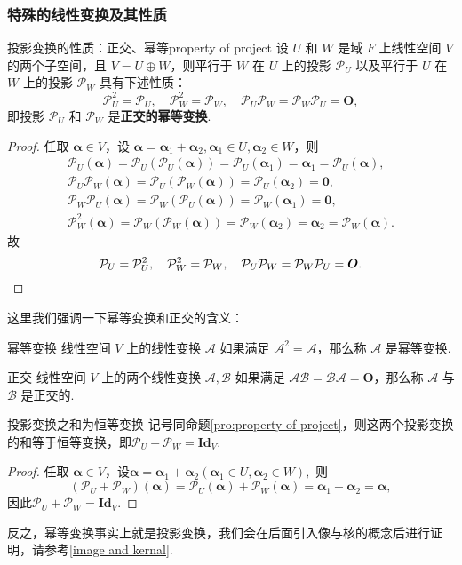 \documentclass[12pt, a4paper,newtx]{ctexart}
\begin{document}
\subsubsection{特殊的线性变换及其性质}
\begin{proposition}{投影变换的性质：正交、幂等}{property of project}
	设 $U$ 和 $W$ 是域 $F$ 上线性空间 $V$ 的两个子空间，且 $V = U \oplus W$，则平行于 $W$ 在 $U$ 上的投影 $\mathcal{P}_U$ 以及平行于 $U$ 在 $W$ 上的投影 $\mathcal{P}_W$ 具有下述性质：
	\[
	\mathcal{P}_U^2 = \mathcal{P}_U, \quad\mathcal{P}_W^2 = \mathcal{P}_W, \quad \mathcal{P}_U \mathcal{P}_W = \mathcal{P}_W \mathcal{P}_U = \bm O, 
	\]
	即投影 $\mathcal{P}_U$ 和 $\mathcal{P}_W$ 是\textbf{正交的幂等变换}. 
\end{proposition}
\begin{proof}
	任取 $\bm\alpha \in V$，设 $\bm\alpha = \bm\alpha_1 + \bm\alpha_2, \bm\alpha_1 \in U, \bm\alpha_2 \in W$，则
	\begin{gather*}
		\mathcal{P}_U(\bm\alpha) = \mathcal{P}_U(\mathcal{P}_U(\bm\alpha)) = \mathcal{P}_U(\bm\alpha_1) = \bm\alpha_1 = \mathcal{P}_U(\bm\alpha),\\\mathcal{P}_U \mathcal{P}_W(\bm\alpha) = \mathcal{P}_U(\mathcal{P}_W(\bm\alpha)) = \mathcal{P}_U(\bm\alpha_2) = \bm0,\\	\mathcal{P}_W \mathcal{P}_U(\bm\alpha) = \mathcal{P}_W(\mathcal{P}_U(\bm\alpha)) = \mathcal{P}_W(\bm\alpha_1) = \bm0,\\	\mathcal{P}_W^2(\bm\alpha) = \mathcal{P}_W(\mathcal{P}_W(\bm\alpha)) = \mathcal{P}_W(\bm\alpha_2) = \bm\alpha_2 = \mathcal{P}_W(\bm\alpha).
	\end{gather*}
	故
	\[
	\mathcal{P}_U = \mathcal{P}_U^2, \quad \mathcal{P}_W^2 = \mathcal{P}_W, \quad \mathcal{P}_U \mathcal{P}_W = \mathcal{P}_W \mathcal{P}_U = \bm O. \qedhere
	\]
\end{proof}
这里我们强调一下幂等变换和正交的含义：
\begin{definition}{幂等变换}{}\kaishu
	线性空间 $V$ 上的线性变换 $\mathcal{A}$ 如果满足 $\mathcal{A}^2 = \mathcal{A}$，那么称 $\mathcal{A}$ 是{\heiti 幂等变换}. 
\end{definition}
\begin{definition}{正交}{}\kaishu 
	线性空间 $V$ 上的两个线性变换 $\mathcal{A}, \mathcal{B}$ 如果满足 $\mathcal{A}\mathcal{B} = \mathcal{B}\mathcal{A} = \bm O$，那么称 $\mathcal{A}$ 与 $\mathcal{B}$ 是{\heiti 正交的}.
\end{definition}
\begin{proposition}{投影变换之和为恒等变换}{}
	记号同命题\ref{pro:property of project}，则这两个投影变换的和等于恒等变换，即$\mathcal P_U+\mathcal P_W=\mathbf{Id}_V$. 
\end{proposition}
\begin{proof}
	任取 $\bm\alpha \in V$，设$\bm\alpha = \bm\alpha_1 + \bm\alpha_2\left(\bm\alpha_1 \in U, \bm\alpha_2 \in W\right),$
	则
	\[
	(\mathcal{P}_U + \mathcal{P}_W)(\bm\alpha) = \mathcal{P}_U (\bm\alpha) + \mathcal{P}_W (\bm\alpha) = \bm\alpha_1 + \bm\alpha_2 = \bm\alpha,
	\]
	因此$\mathcal P_U+\mathcal P_W=\mathbf{Id}_V.$
\end{proof}
反之，幂等变换事实上就是投影变换，我们会在后面引入像与核的概念后进行证明，请参考\ref{image and kernal}. 
\end{document}
